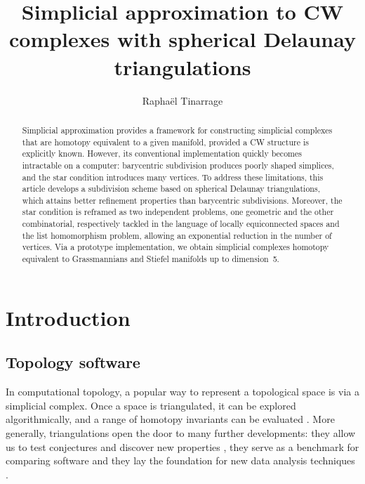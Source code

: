 \documentclass[a4paper,english,cleveref,autoref,thm-restate,nolineno]{socg-lipics-v2021}
\title{Simplicial approximation to CW complexes with spherical Delaunay triangulations}
\author{Raphaël Tinarrage}{Institute of Science and Technology Austria, Klosterneuburg, Austria \and \url{https://raphaeltinarrage.github.io/} }{raphael.tinarrage@ist.ac.at}{https://orcid.org/0000-0002-1404-1095}{}
\begin{document}
\maketitle

\begin{abstract}
	Simplicial approximation provides a framework for constructing simplicial complexes that are homotopy equivalent to a given manifold, provided a CW structure is explicitly known.
	However, its conventional implementation quickly becomes intractable on a computer: barycentric subdivision produces poorly shaped simplices, and the star condition introduces many vertices. 
	To address these limitations, this article develops a subdivision scheme based on spherical Delaunay triangulations, which attains better refinement properties than barycentric subdivisions.
	Moreover, the star condition is reframed as two independent problems, one geometric and the other combinatorial, respectively tackled in the language of locally equiconnected spaces and the list homomorphism problem, allowing an exponential reduction in the number of vertices.
	Via a prototype implementation, we obtain simplicial complexes homotopy equivalent to Grassmannians and Stiefel manifolds up to dimension~5.
\end{abstract}

\section{Introduction}
\label{sec:intro}

\subsection{Topology software}

In computational topology, a popular way to represent a topological space is via a simplicial complex. 
Once a space is triangulated, it can be explored algorithmically, and a range of homotopy invariants can be evaluated \cite{DBLP:conf/soda/CadekKMSVW12,vcadek2014computing,cadek2014polynomial,Green_2015,vcadek2017algorithmic,10.5555/3174304.3175344,filakovsky2018computing,filakovsky2020two,vokvrinek2017decidability,manin2024algorithmic}.
More generally, triangulations open the door to many further developments: they allow us to test conjectures and discover new properties \cite{benedetti2014random,benedetti2024random}, they serve as a benchmark for comparing software \cite{bell2018computing,ballester2024mantra,telyatnikov2024topobench} and they lay the foundation for new data analysis techniques \cite{sheth2003measuring,stoecker2013interactive,ericok2022quotient,tinarrage2022computing}.
\end{document}
